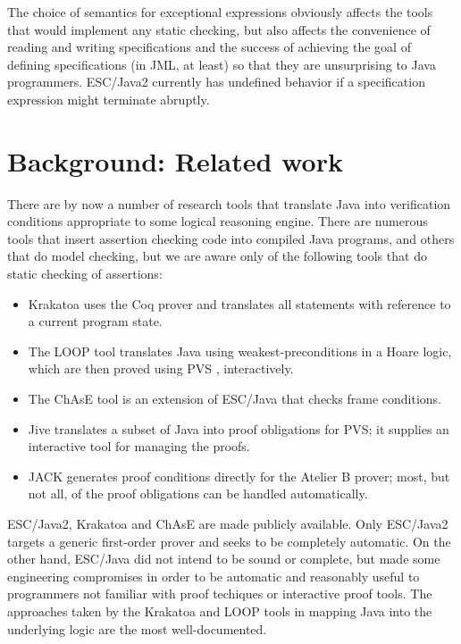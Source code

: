 \documentclass{sig-alternate}
\begin{document}
The choice of semantics for exceptional expressions obviously affects the tools that would
implement any static checking, but also affects the convenience of reading and 
writing specifications and the success of achieving the goal of defining specifications (in JML, 
at least) so that they are unsurprising to Java programmers.  ESC/Java2 currently has
undefined behavior if a specification expression might terminate abruptly.


\section{Background: Related work}

There are by now a number of research tools that translate Java into verification conditions
appropriate to some logical reasoning engine.  There are numerous tools that insert
assertion checking code into compiled Java programs, and others that do model checking,
but
we are aware only of the following tools that do static
checking of assertions:
\begin{itemize}
\setlength{\itemsep}{0in}
\item Krakatoa \cite{krakatoa03a} uses the Coq prover and 
translates all statements with reference to a current program state. 
\item The LOOP tool \cite{JacobsPoll01a,Jacobs03}
 translates Java using weakest-preconditions in a Hoare logic,
which are then proved using PVS \cite{OwreRRSS96}, interactively.  
\item The ChAsE tool \cite{CH03} is an extension of ESC/Java that checks frame conditions.
\item Jive \cite{MeyerMuellerPoetzsch-Heffter00} translates a subset of Java into proof
obligations for PVS; it supplies an interactive tool for managing the proofs.
\item JACK \cite{JACK} generates proof conditions directly for the Atelier B prover; 
most, but not all, of
the proof obligations can be handled automatically. 
\end{itemize}

ESC/Java2, Krakatoa and ChAsE are made publicly available.  Only ESC/Java2 targets a
generic first-order prover and seeks to be completely automatic.  On the other hand, ESC/Java
did not intend to be sound or complete, but made some engineering compromises in order to
be automatic and reasonably useful to programmers not familiar with proof techiques or
interactive proof tools.  The approaches taken by the Krakatoa and LOOP tools in mapping
Java into the underlying logic are the most well-documented.
\end{document}
